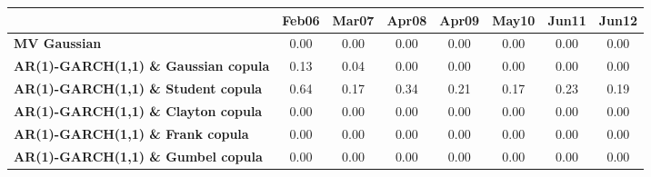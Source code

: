 \begin{scriptsize}
\begin{tabular}{lccccccc}
&\textbf{Feb06}&\textbf{Mar07}&\textbf{Apr08}&\textbf{Apr09}&\textbf{May10}&\textbf{Jun11}&\textbf{Jun12}\\\hline
\textbf{MV Gaussian}&0.00&0.00&0.00&0.00&0.00&0.00&0.00\\
\textbf{AR(1)-GARCH(1,1) \& Gaussian copula}&0.13&0.04&0.00&0.00&0.00&0.00&0.00\\
\textbf{AR(1)-GARCH(1,1) \& Student copula}&0.64&0.17&0.34&0.21&0.17&0.23&0.19\\
\textbf{AR(1)-GARCH(1,1) \& Clayton copula}&0.00&0.00&0.00&0.00&0.00&0.00&0.00\\
\textbf{AR(1)-GARCH(1,1) \& Frank copula}&0.00&0.00&0.00&0.00&0.00&0.00&0.00\\
\textbf{AR(1)-GARCH(1,1) \& Gumbel copula}&0.00&0.00&0.00&0.00&0.00&0.00&0.00\\
\end{tabular}
\end{scriptsize}
